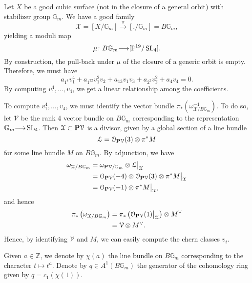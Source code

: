 \documentclass[12pt,reqno]{amsart}
\renewcommand{\to}{{\longrightarrow}}
\numberwithin{equation}{section}
\begin{document}
Let $X$ be a good cubic surface (not in the closure of a general orbit) with stabilizer group $\mathbb G_m$.
We have a good family
\[ \mathcal X = [X / \mathbb G_m] \xrightarrow{\pi} [. / \mathbb G_m] = B\mathbb G_m,\]
yielding a moduli map
\[\mu \colon B \mathbb G_m \to [\mathbb P^{19}/\SL_4].\]
By construction, the pull-back under $\mu$ of the closure of a generic orbit is empty.
Therefore, we must have
\[ a_{1^4} v_1^4 + a_{1^22}v_1^2v_2 + a_{13}v_1v_3 + a_{2^2}v_2^2 + a_4v_4 = 0.\]
By computing $v_1^4, \dots, v_4$, we get a linear relationship among the coefficients.

To compute $v_1^4, \dotso, v_4$, we must identify the vector bundle $\pi_* \left( \omega_{\mathcal X/B\mathbb G_m}^{-1}\right)$.
To do so, let $\mathcal V$ be the rank 4 vector bundle on $B \mathbb G_m$ corresponding to the representation $\mathbb G_m \to \SL_4$.
Then $\mathcal X \subset \P \mathcal V$ is a divisor, given by a global section of a line bundle
\[ \mathcal L = \mathcal O_{\P \mathcal V}(3) \otimes \pi^* M\]
for some line bundle $M$ on $B\mathbb G_m$.
By adjunction, we have
\begin{align*}
  \omega_{\mathcal X/B\mathbb G_m} &= \omega_{\P \mathcal V / \mathbb G_m} \otimes \mathcal L \big|_{\mathcal X}\\
                                   &= \mathcal O_{\P \mathcal V}(-4) \otimes \mathcal O_{\P \mathcal V}(3) \otimes \pi^* M \big|_{\mathcal X} \\
                                   &= \mathcal O_{\P \mathcal V}(-1) \otimes \pi^* M \big |_{\mathcal X},
\end{align*}
and hence
\begin{align*}
  \pi_* \left( \omega_{\mathcal X/B\mathbb G_m}  \right) &= \pi_* \left( \mathcal O_{\P \mathcal V}(1) \big|_{\mathcal X} \right) \otimes M^\vee \\
  &= \mathcal V \otimes M^\vee.
\end{align*}
Hence, by identifying $\mathcal V$ and $M$, we can easily compute the chern classes $v_i$.

Given $a \in \mathbb Z$, we denote by $\chi(a)$ the line bundle on $B\mathbb G_m$ corresponding to the character $t \mapsto t^a$.
Denote by $q \in A^1(B\mathbb G_m)$ the generator of the cohomology ring given by $q = c_1(\chi(1))$.
\end{document}
